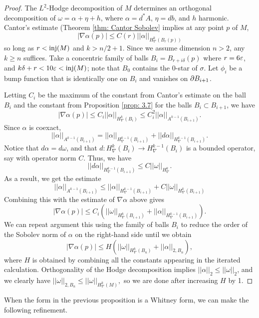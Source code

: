 \begin{proof}

The $L^2$-Hodge decomposition of $M$ determines an orthogonal decomposition of $\omega= \alpha + \eta + h$, where $\alpha = d^*A$, $\eta = db$, and $h$ harmonic. Cantor’s estimate (Theorem \ref{thm: Cantor Sobolev} implies at any point $p$ of $M$, $$|\nabla \alpha (p)| \leq C(r)||\alpha||_{H^k_{\nabla}(B_r(p))}$$ so long as $r<\operatorname{inj}(M)$ and $k > n/2 + 1$. Since we assume dimension $n>2$, any $k\geq n$ suffices.
Take a concentric family of balls $B_i = B_{r + i\delta}(p)$ where $r = 6\varepsilon$, and $k\delta + r < 10\varepsilon < \operatorname{inj}(M)$; note that $B_0$ contains the 0-star of $\sigma$. Let $\phi_i$ be a bump function that is identically one on $B_i$ and vanishes on $\partial B_{i+1}$.

Letting $C_i$ be the maximum of the constant from Cantor’s estimate on the ball $B_i$ and the constant from Proposition \ref{prop: 3.7} for the balls $B_i\subset B_{i+1}$, we have
$$|\nabla \alpha (p)| \leq C_i||\alpha||_{H^k_{\nabla}(B_i)}
   \leq  C_i^2||\alpha||_{A^{k-1}(B_{i+1})}.$$
Since $\alpha$ is coexact, $$||\alpha||_{A^{k-1}(B_{i+1})} = ||\alpha||_{H^{k-1}_{\nabla}(B_{i+1})} + ||d\alpha||_{H^{k-1}_{\nabla}(B_{i+1})}.$$ Notice that $d\alpha = d\omega$, and that $d:H^k_{\nabla}(B_i)\to H^{k-1}_{\nabla}(B_i)$ is a bounded operator, say with operator norm $C$. Thus, we have $$||d\alpha||_{H^{k-1}_{\nabla}(B_{i+1})} \leq C||\omega||_{H^k_{\nabla}}.$$ As a result, we get the estimate $$||\alpha||_{A^{k-1}(B_{i+1})} \leq ||\alpha||_{H^{k-1}_{\nabla}(B_{i+1})} + C||\omega||_{H^{k}_{\nabla}(B_{i+1})}$$
Combining this with the estimate of $\nabla \alpha$ above gives $$|\nabla \alpha(p)|\leq C_i\left(||\omega||_{H^{k}_{\nabla}(B_{i+1})}+||\alpha||_{H^{k-1}_{\nabla}(B_{i+1})}\right).$$
We can repeat argument this using the family of balls $B_i$ to reduce the order of the Sobolev norm of $\alpha$ on the right-hand side until we obtain $$|\nabla \alpha(p)|\leq H\left(||\omega||_{H^k_{\nabla}(B_n)} + ||\alpha||_{2,B_n}\right),$$ where $H$ is obtained by combining all the constants appearing in the iterated calculation. Orthogonality of the Hodge decomposition implies $||\alpha||_2\leq ||\omega||_2$, and we clearly have $||\omega||_{2, B_n}\leq ||\omega||_{H^k_{\nabla}(M)},$ so we are done after increasing $H$ by 1.
\end{proof}

When the form in the previous proposition is a Whitney form, we can make the following refinement.

